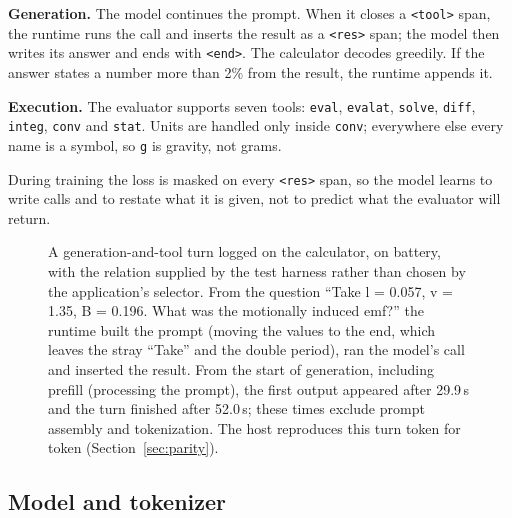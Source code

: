 \documentclass[10pt]{article}
\newcommand{\tok}[1]{\texttt{\small #1}}
\begin{document}
\textbf{Generation.} The model continues the prompt. When it closes a \tok{<tool>} span, the runtime runs
the call and inserts the result as a \tok{<res>} span; the model then writes its answer and ends with
\tok{<end>}. The calculator decodes greedily. If the answer states a number more than 2\% from the result,
the runtime appends it.

\textbf{Execution.} The evaluator supports seven tools: \tok{eval}, \tok{evalat}, \tok{solve}, \tok{diff},
\tok{integ}, \tok{conv} and \tok{stat}. Units are handled only inside \tok{conv}; everywhere else every
name is a symbol, so \tok{g} is gravity, not grams.

During training the loss is masked on every \tok{<res>} span, so the model learns to write calls and to
restate what it is given, not to predict what the evaluator will return.

\begin{figure}[t]
\centering
{}
\caption{A generation-and-tool turn logged on the calculator, on battery, with the relation supplied
by the test harness rather than chosen by the application's selector. From the question ``Take
l = 0.057, v = 1.35, B = 0.196. What was the motionally induced emf?'' the runtime built the prompt
(moving the values to the end, which leaves the stray ``Take'' and the double period), ran the
model's call and inserted the result. From the start of generation, including prefill (processing the
prompt), the first output appeared after 29.9\,s and the turn finished after 52.0\,s; these times exclude
prompt assembly and tokenization. The host reproduces this turn token for token
(Section~\ref{sec:parity}).}
\label{fig:exchange}
\end{figure}

\subsection{Model and tokenizer}
\end{document}
